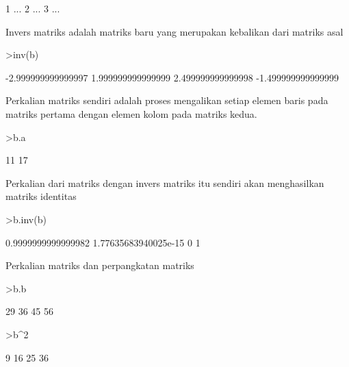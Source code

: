 \documentclass[a4paper,10pt]{article}
\begin{document}
\begin{eulernotebook}
\begin{eulercomment}
\begin{eulercomment}
\begin{eulercomment}
\begin{eulercomment}
\begin{euleroutput}
                        1     ...
                        2     ...
                        3     ...
\end{euleroutput}
\begin{eulercomment}
Invers matriks adalah matriks baru yang merupakan kebalikan dari
matriks asal
\end{eulercomment}
\begin{eulerprompt}
>inv(b)
\end{eulerprompt}
\begin{euleroutput}
       -2.999999999999997       1.999999999999999 
        2.499999999999998      -1.499999999999999 
\end{euleroutput}
\begin{eulercomment}
Perkalian matriks sendiri adalah proses mengalikan setiap elemen baris
pada matriks pertama dengan elemen kolom pada matriks kedua.
\end{eulercomment}
\begin{eulerprompt}
>b.a
\end{eulerprompt}
\begin{euleroutput}
                       11 
                       17 
\end{euleroutput}
\begin{eulercomment}
Perkalian dari matriks dengan invers matriks itu sendiri akan
menghasilkan matriks identitas
\end{eulercomment}
\begin{eulerprompt}
>b.inv(b)
\end{eulerprompt}
\begin{euleroutput}
       0.9999999999999982    1.77635683940025e-15 
                        0                       1 
\end{euleroutput}
\begin{eulercomment}
Perkalian matriks dan perpangkatan matriks
\end{eulercomment}
\begin{eulerprompt}
>b.b
\end{eulerprompt}
\begin{euleroutput}
                       29                      36 
                       45                      56 
\end{euleroutput}
\begin{eulerprompt}
>b^2
\end{eulerprompt}
\begin{euleroutput}
                        9                      16 
                       25                      36 

\end{euleroutput}
\end{eulercomment}
\end{eulercomment}
\end{eulercomment}
\end{eulercomment}
\end{eulernotebook}
\end{document}
